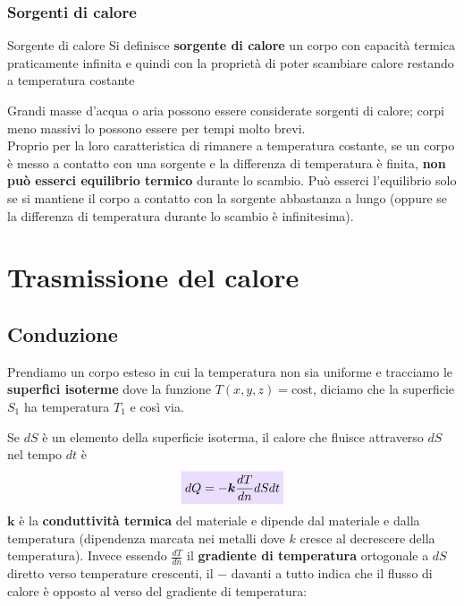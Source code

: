 \documentclass[x11names]{report}
\newcommand{\viola}[1]{\colorbox{yred}{$\displaystyle #1$}}
\begin{document}
	\subsubsection{Sorgenti di calore}
	\begin{center}
		\colorbox{yblue}{\begin{minipage}{5.75in}
				\begin{blues}{Sorgente di calore}
					Si definisce \textbf{sorgente di calore} un corpo con capacità termica praticamente infinita e quindi con la proprietà di poter scambiare calore restando a temperatura costante
				\end{blues}
		\end{minipage}}
	\end{center}
	Grandi masse d'acqua o aria possono essere considerate sorgenti di calore; corpi meno massivi lo possono essere per tempi molto brevi.\\
	
	\noindent
	Proprio per la loro caratteristica di rimanere a temperatura costante, se un corpo è messo a contatto con una sorgente e la differenza di temperatura è finita, \textbf{non può esserci equilibrio termico} durante lo scambio. Può esserci l'equilibrio solo se si mantiene il corpo a contatto con la sorgente abbastanza a lungo (oppure se la differenza di temperatura durante lo scambio è infinitesima).
	
	
	\section{Trasmissione del calore}
	
	\subsection{Conduzione}
	Prendiamo un corpo esteso in cui la temperatura non sia uniforme e tracciamo le \textbf{superfici isoterme} dove la funzione \(T(x,y,z) = \text{cost}\), diciamo che la superficie \(S_1\) ha temperatura \(T_1\) e così via. 
	
	Se \(dS\) è un elemento della superficie isoterma, il calore che fluisce attraverso \(dS\) nel tempo \(dt\) è 
	\begin{equation}\label{fourier calore}
		\viola{dQ = -\boldsymbol{k} \frac{dT}{dn}dS dt}
	\end{equation}
	\(\boldsymbol{k}\) è la \textbf{conduttività termica} del materiale e dipende dal materiale e dalla temperatura (dipendenza marcata nei metalli dove \(k\) cresce al decrescere della temperatura). Invece essendo \(\frac{dT}{dn}\) il \textbf{gradiente di temperatura} ortogonale a \(dS\) diretto verso temperature crescenti, il \(\boldsymbol{-}\) davanti a tutto indica che il flusso di calore è opposto al verso del gradiente di temperatura:\\
	
\end{document}
